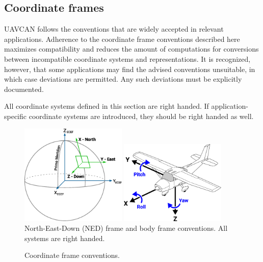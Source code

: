 \subsection{Coordinate frames}

UAVCAN follows the conventions that are widely accepted in relevant applications.
Adherence to the coordinate frame conventions described here maximizes compatibility and
reduces the amount of computations for conversions between incompatible coordinate systems and
representations.
It is recognized, however, that some applications may find the advised conventions unsuitable,
in which case deviations are permitted.
Any such deviations must be explicitly documented.

All coordinate systems defined in this section are right handed.
If application-specific coordinate systems are introduced, they should be right handed as well.

\begin{figure}[hbt]
    \centering
	\includegraphics[width=0.45\textwidth]{application_layer/NED_ECEF}
    \includegraphics[width=0.45\textwidth]{application_layer/aircraft_principal_axes}
    North-East-Down (NED) frame and body frame conventions. All systems are right handed.
    \caption{
        Coordinate frame conventions.
        \label{fig:application_coordinate_frame_conventions}
    }
\end{figure}

